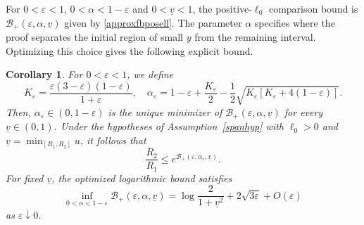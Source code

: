 \documentclass[amsmath,amsfonts,amssymb,aps,pra,superscriptaddress,10pt]{revtex4-2}
\numberwithin{equation}{section}
\theoremstyle{plain}
\newtheorem{corollary}{Corollary}
\theoremstyle{definition}
\theoremstyle{remark}
\theoremstyle{definition}
\newcommand{\ellzero}{\ell_0}
\begin{document}
For $0<\varepsilon<1$, $0<\alpha<1-\varepsilon$ and $0<\underline{v}<1$, the positive-$\ellzero$ comparison bound is $\mathcal{B}_+(\varepsilon,\alpha,\underline{v})$ given by \eqref{approxfbposell}. The parameter $\alpha$ specifies where the proof separates the initial region of small $y$ from the remaining interval. Optimizing this choice gives the following explicit bound.

\begin{corollary}
For $0<\varepsilon<1$, we define
\begin{equation}\label{eq:alpha-optimal}
K_\varepsilon=\frac{\varepsilon(3-\varepsilon)(1-\varepsilon)}{1+\varepsilon},\quad
\alpha_\varepsilon=1-\varepsilon+\frac{K_\varepsilon}{2}
-\frac{1}{2}\sqrt{K_\varepsilon[K_\varepsilon+4(1-\varepsilon)]}.
\end{equation}
Then, $\alpha_\varepsilon\in(0,1-\varepsilon)$ is the unique minimizer of $\mathcal{B}_+(\varepsilon,\alpha,\underline{v})$ for every $\underline{v}\in(0,1)$. Under the hypotheses of Assumption~\ref{spanhyp} with $\ellzero>0$ and $\underline{v}=\min_{[R_1,R_2]}u$, it follows that
\begin{equation}\label{optposellr}
\frac{R_2}{R_1}\leq e^{\mathcal{B}_+(\varepsilon,\alpha_\varepsilon,\underline{v})}.
\end{equation}
For fixed $\underline{v}$, the optimized logarithmic bound satisfies
\begin{equation}\label{optsmallepsexp}
\inf_{0<\alpha<1-\varepsilon}\mathcal{B}_+(\varepsilon,\alpha,\underline{v})=\log{\frac{2}{1+\underline{v}^2}}
+2\sqrt{3\varepsilon}+O(\varepsilon)
\end{equation}
as $\varepsilon\downarrow 0$.
\end{corollary}
\end{document}
